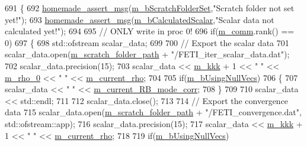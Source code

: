 \begin{DoxyCode}
691 \{
692     \hyperlink{common__header_8h_a593ccc80b790b2268653fcf6597bf451}{homemade\_assert\_msg}(\hyperlink{classcarl_1_1_f_e_t_i___operations_a8bb9de7de35a2f7d7d5982ae1085ba15}{m\_bScratchFolderSet},\textcolor{stringliteral}{"Scratch folder not set
       yet!"});
693     \hyperlink{common__header_8h_a593ccc80b790b2268653fcf6597bf451}{homemade\_assert\_msg}(\hyperlink{classcarl_1_1_f_e_t_i___operations_a2e115c189d8adcfc8451c505a3a9cb05}{m\_bCalculatedScalar},\textcolor{stringliteral}{"Scalar data not
       calculated yet!"});
694 
695     \textcolor{comment}{// ONLY write in proc 0!}
696     \textcolor{keywordflow}{if}(\hyperlink{classcarl_1_1_f_e_t_i___operations_a8cb0ed286667fc9f3ebc2d8ef2a3e13b}{m\_comm}.rank() == 0)
697     \{
698         std::ofstream scalar\_data;
699 
700         \textcolor{comment}{// Export the scalar data}
701         scalar\_data.open(\hyperlink{classcarl_1_1_f_e_t_i___operations_ad6d35bc9b5221d45452fbc8931f22055}{m\_scratch\_folder\_path} + \textcolor{stringliteral}{"/FETI\_iter\_scalar\_data.dat"});
702         scalar\_data.precision(15);
703         scalar\_data << \hyperlink{classcarl_1_1_f_e_t_i___operations_aae9d8e6d2d0436cda061359f1602b096}{m\_kkk} + 1 << \textcolor{stringliteral}{" "} << \hyperlink{classcarl_1_1_f_e_t_i___operations_a7d44cceb8c3e003f9e8c22972602fcc8}{m\_rho\_0} << \textcolor{stringliteral}{" "} << 
      \hyperlink{classcarl_1_1_f_e_t_i___operations_a1ecd729d4399772a6741c3b4bf69a69a}{m\_current\_rho};
704 
705         \textcolor{keywordflow}{if}(\hyperlink{classcarl_1_1_f_e_t_i___operations_aff68699ccceb6e1debc4ecab97dde2ff}{m\_bUsingNullVecs})
706         \{
707             scalar\_data <<  \textcolor{stringliteral}{" "} << \hyperlink{classcarl_1_1_f_e_t_i___operations_a22ebb1138a1a8ca2b88d33c17a8fe299}{m\_current\_RB\_mode\_corr};
708         \}
709 
710         scalar\_data << std::endl;
711 
712         scalar\_data.close();
713 
714         \textcolor{comment}{// Export the convergence data}
715         scalar\_data.open(\hyperlink{classcarl_1_1_f_e_t_i___operations_ad6d35bc9b5221d45452fbc8931f22055}{m\_scratch\_folder\_path} + \textcolor{stringliteral}{"/FETI\_convergence.dat"},
      std::ofstream::app);
716         scalar\_data.precision(15);
717         scalar\_data << \hyperlink{classcarl_1_1_f_e_t_i___operations_aae9d8e6d2d0436cda061359f1602b096}{m\_kkk} + 1 << \textcolor{stringliteral}{" "} << \hyperlink{classcarl_1_1_f_e_t_i___operations_a1ecd729d4399772a6741c3b4bf69a69a}{m\_current\_rho};
718 
719         \textcolor{keywordflow}{if}(\hyperlink{classcarl_1_1_f_e_t_i___operations_aff68699ccceb6e1debc4ecab97dde2ff}{m\_bUsingNullVecs})

\end{DoxyCode}
